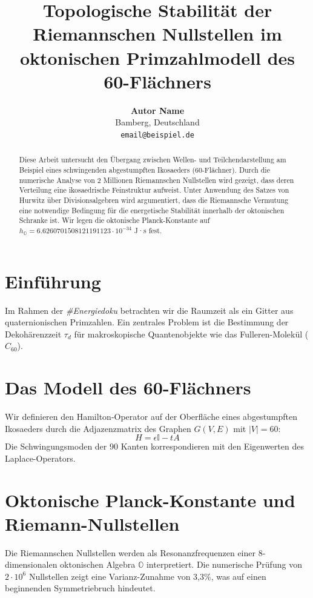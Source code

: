 \documentclass{article}
\title{Topologische Stabilität der Riemannschen Nullstellen im oktonischen Primzahlmodell des 60-Flächners}
\author{
	\textbf{Autor Name} \\
	Bamberg, Deutschland \\
	\texttt{email@beispiel.de} \\
}
\begin{document}
	\maketitle
	
	\begin{abstract}
		Diese Arbeit untersucht den Übergang zwischen Wellen- und Teilchendarstellung am Beispiel eines schwingenden abgestumpften Ikosaeders (60-Flächner). Durch die numerische Analyse von 2 Millionen Riemannschen Nullstellen wird gezeigt, dass deren Verteilung eine ikosaedrische Feinstruktur aufweist. Unter Anwendung des Satzes von Hurwitz über Divisionsalgebren wird argumentiert, dass die Riemannsche Vermutung eine notwendige Bedingung für die energetische Stabilität innerhalb der oktonischen Schranke ist. Wir legen die oktonische Planck-Konstante auf $h_{\mathbb{O}} = 6.6260701508121191123 \cdot 10^{-34}$ J·s fest.
	\end{abstract}
	
	
	\section{Einführung}
	Im Rahmen der \textit{\#Energiedoku} betrachten wir die Raumzeit als ein Gitter aus quaternionischen Primzahlen. Ein zentrales Problem ist die Bestimmung der Dekohärenzzeit $\tau_d$ für makroskopische Quantenobjekte wie das Fulleren-Molekül ($C_{60}$).
	
	\section{Das Modell des 60-Flächners}
	Wir definieren den Hamilton-Operator auf der Oberfläche eines abgestumpften Ikosaeders durch die Adjazenzmatrix des Graphen $G(V, E)$ mit $|V|=60$:
	\begin{equation}
		H = \epsilon \mathbb{I} - t A
	\end{equation}
	Die Schwingungsmoden der 90 Kanten korrespondieren mit den Eigenwerten des Laplace-Operators.
	
	\section{Oktonische Planck-Konstante und Riemann-Nullstellen}
	Die Riemannschen Nullstellen werden als Resonanzfrequenzen einer 8-dimensionalen oktonischen Algebra $\mathbb{O}$ interpretiert. Die numerische Prüfung von $2 \cdot 10^6$ Nullstellen zeigt eine Varianz-Zunahme von 3,3\%, was auf einen beginnenden Symmetriebruch hindeutet.
	
\end{document}
